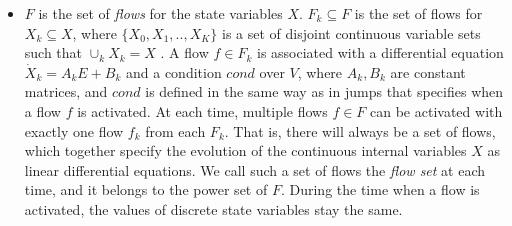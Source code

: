 \documentclass[sigconf]{acmart}
\begin{document}
\begin{definition}
\begin{itemize}
    \item $F$ is the set of {\em flows} for the state variables $X$. $F_k \subseteq F$ is the set of flows for $X_k \subseteq X$, where $\{X_0,X_1,..,X_K\}$ is a set of disjoint continuous variable sets such that $\cup_{k} X_k = X$ . A flow $f \in F_k$ is associated with a differential equation $\dot X_k = A_k E + B_k$ and a condition $\textit{cond}$ over $V$, where $A_k, B_k$ are constant matrices, and $\textit{cond}$ is defined in the same way as in jumps that specifies when a flow $f$ is activated.
    At each time, multiple flows $f \in F$ can be activated with exactly one flow $f_k$ from each $F_k$. That is, there will always be a set of flows, which together specify the evolution of the continuous internal variables $X$ as linear differential equations. We call such a set of flows the {\em flow set} at each time, and it belongs to the power set of $F$. During the time when a flow is activated, the values of discrete state variables stay the same.
    
\end{itemize}
\end{definition}

    
\end{document}
